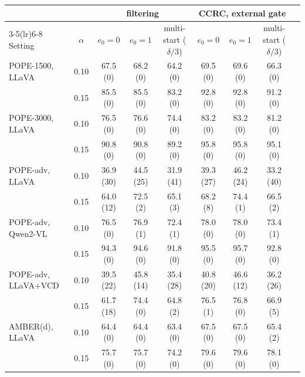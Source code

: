 \begin{tabular}{lcccccccc}
\toprule
 & & \multicolumn{3}{c}{filtering} & \multicolumn{3}{c}{CCRC, external gate}\\
\cmidrule(lr){3-5}\cmidrule(lr){6-8}
Setting & $\alpha$ & $e_0{=}0$ & $e_0{=}1$ & multi-start ($\delta/3$) & $e_0{=}0$ & $e_0{=}1$ & multi-start ($\delta/3$)\\
\midrule
POPE-1500, LLaVA & 0.10 & 67.5 (0) & 68.2 (0) & 64.2 (0) & 69.5 (0) & 69.6 (0) & 66.3 (0)\\
 & 0.15 & 85.5 (0) & 85.5 (0) & 83.2 (0) & 92.8 (0) & 92.8 (0) & 91.2 (0)\\
\addlinespace
POPE-3000, LLaVA & 0.10 & 76.5 (0) & 76.6 (0) & 74.4 (0) & 83.2 (0) & 83.2 (0) & 81.2 (0)\\
 & 0.15 & 90.8 (0) & 90.8 (0) & 89.2 (0) & 95.8 (0) & 95.8 (0) & 95.1 (0)\\
\addlinespace
POPE-adv, LLaVA & 0.10 & 36.9 (30) & 44.5 (25) & 31.9 (41) & 39.3 (27) & 46.2 (24) & 33.2 (40)\\
 & 0.15 & 64.0 (12) & 72.5 (2) & 65.1 (3) & 68.2 (8) & 74.4 (1) & 66.5 (2)\\
\addlinespace
POPE-adv, Qwen2-VL & 0.10 & 76.5 (0) & 76.9 (1) & 72.4 (1) & 78.0 (0) & 78.0 (0) & 73.4 (1)\\
 & 0.15 & 94.3 (0) & 94.6 (0) & 91.8 (0) & 95.5 (0) & 95.7 (0) & 92.8 (0)\\
\addlinespace
POPE-adv, LLaVA+VCD & 0.10 & 39.5 (22) & 45.8 (14) & 35.4 (28) & 40.8 (20) & 46.6 (12) & 36.2 (26)\\
 & 0.15 & 61.7 (18) & 74.4 (0) & 64.8 (2) & 76.5 (1) & 76.8 (0) & 66.9 (5)\\
\addlinespace
AMBER(d), LLaVA & 0.10 & 64.4 (0) & 64.4 (0) & 63.4 (0) & 67.5 (0) & 67.5 (0) & 65.4 (2)\\
 & 0.15 & 75.7 (0) & 75.7 (0) & 74.2 (0) & 79.6 (0) & 79.6 (0) & 78.1 (0)\\
\bottomrule
\end{tabular}
